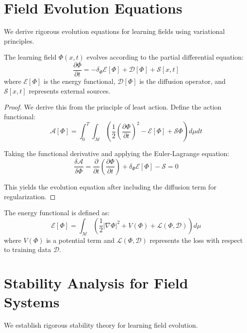 \section{Field Evolution Equations}

We derive rigorous evolution equations for learning fields using variational principles.

\begin{theorem}
\label{thm:field_evolution}
The learning field $\Phi(x,t)$ evolves according to the partial differential equation:
$$\frac{\partial \Phi}{\partial t} = -\delta_\Phi \mathcal{E}[\Phi] + \mathcal{D}[\Phi] + \mathcal{S}[x,t]$$
where $\mathcal{E}[\Phi]$ is the energy functional, $\mathcal{D}[\Phi]$ is the diffusion operator, and $\mathcal{S}[x,t]$ represents external sources.
\end{theorem}

\begin{proof}
We derive this from the principle of least action. Define the action functional:
$$\mathcal{A}[\Phi] = \int_0^T \int_{\mathcal{M}} \left(\frac{1}{2}\left(\frac{\partial \Phi}{\partial t}\right)^2 - \mathcal{E}[\Phi] + \mathcal{S}\Phi\right) d\mu dt$$

Taking the functional derivative and applying the Euler-Lagrange equation:
$$\frac{\delta \mathcal{A}}{\delta \Phi} = \frac{\partial}{\partial t}\left(\frac{\partial \Phi}{\partial t}\right) + \delta_\Phi \mathcal{E}[\Phi] - \mathcal{S} = 0$$

This yields the evolution equation after including the diffusion term for regularization.
\end{proof}

\begin{definition}
\label{def:energy_functional}
The energy functional is defined as:
$$\mathcal{E}[\Phi] = \int_{\mathcal{M}} \left(\frac{1}{2}|\nabla \Phi|^2 + V(\Phi) + \mathcal{L}(\Phi, \mathcal{D})\right) d\mu$$
where $V(\Phi)$ is a potential term and $\mathcal{L}(\Phi, \mathcal{D})$ represents the loss with respect to training data $\mathcal{D}$.
\end{definition}

\section{Stability Analysis for Field Systems}

We establish rigorous stability theory for learning field evolution.


